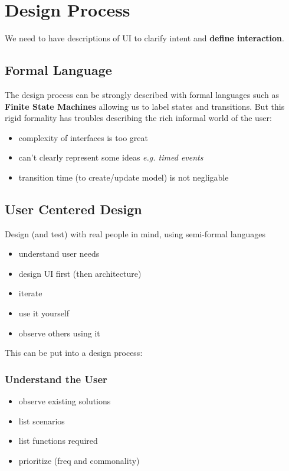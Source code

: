 \documentclass[]{article}
\theoremstyle{definition}
\begin{document}
			\section{Design Process}
				We need to have descriptions of UI to clarify intent and \textbf{define interaction}. 
				\subsection{Formal Language}
				The design process can be strongly described with formal languages such as \textbf{Finite State Machines} allowing us to label states and transitions. But this rigid formality has troubles describing the rich informal world of the user:
				\begin{itemize}
					\item complexity of interfaces is too great
					\item can't clearly represent some ideas \textit{e.g. timed events}
					\item transition time (to create/update model) is not negligable
				\end{itemize}
				\subsection{User Centered Design}
					Design (and test) with real people in mind, using semi-formal languages
					\begin{itemize}
						\item understand user needs
						\item design UI first (then architecture)
						\item iterate
						\item use it yourself
						\item observe others using it
					\end{itemize}
					This can be put into a design process:
					\subsubsection{Understand the User}
						\begin{itemize}
							\item observe existing solutions
							\item list scenarios
							\item list functions required
							\item prioritize (freq and commonality)
						\end{itemize}
\end{document}
